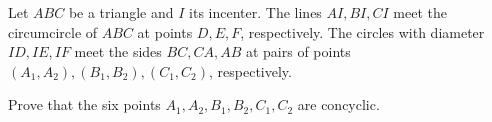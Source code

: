 Let $ABC$ be a triangle and $I$ its incenter. The lines $AI,BI,CI$ meet the circumcircle of $ABC$ at points $ D,E,F$, respectively. The circles with diameter $ ID,IE,IF$ meet the sides $ BC,CA, AB$ at pairs of points $ (A_1,A_2), (B_1, B_2), (C_1, C_2)$, respectively.

Prove that the six points $ A_1,A_2, B_1, B_2, C_1, C_2$ are concyclic.
